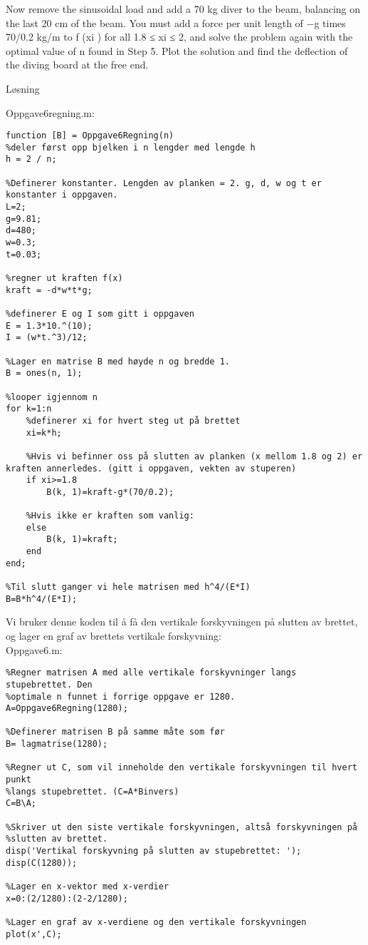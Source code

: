 
%
Now remove the sinusoidal load and add a 70 kg diver to the beam, balancing on the last 20 cm of the beam. You must add a force per unit length of −g times 70/0.2 kg/m to f (xi ) for all 1.8 ≤ xi ≤ 2, and solve the problem again with the optimal value of n found in Step 5. Plot the solution and find the deflection of the diving board at the free end.

\vspace{5mm}
Løsning

Oppgave6regning.m:
\begin{lstlisting}
function [B] = Oppgave6Regning(n)
%deler først opp bjelken i n lengder med lengde h 
h = 2 / n;        

%Definerer konstanter. Lengden av planken = 2. g, d, w og t er konstanter i oppgaven. 
L=2;
g=9.81; 
d=480; 
w=0.3;
t=0.03; 

%regner ut kraften f(x) 
kraft = -d*w*t*g; 

%definerer E og I som gitt i oppgaven
E = 1.3*10.^(10); 
I = (w*t.^3)/12; 

%Lager en matrise B med høyde n og bredde 1. 
B = ones(n, 1);

%looper igjennom n
for k=1:n
	%definerer xi for hvert steg ut på brettet
    xi=k*h; 

    %Hvis vi befinner oss på slutten av planken (x mellom 1.8 og 2) er kraften annerledes. (gitt i oppgaven, vekten av stuperen)
    if xi>=1.8
        B(k, 1)=kraft-g*(70/0.2);

    %Hvis ikke er kraften som vanlig:
    else
        B(k, 1)=kraft;
    end
end;

%Til slutt ganger vi hele matrisen med h^4/(E*I)
B=B*h^4/(E*I);
\end{lstlisting}

Vi bruker denne koden til å få den vertikale forskyvningen på slutten av brettet, og lager en graf av brettets vertikale forskyvning:\\

Oppgave6.m: 

\begin{lstlisting}
%Regner matrisen A med alle vertikale forskyvninger langs stupebrettet. Den
%optimale n funnet i forrige oppgave er 1280.
A=Oppgave6Regning(1280); 

%Definerer matrisen B på samme måte som før
B= lagmatrise(1280); 

%Regner ut C, som vil inneholde den vertikale forskyvningen til hvert punkt
%langs stupebrettet. (C=A*Binvers)
C=B\A; 

%Skriver ut den siste vertikale forskyvningen, altså forskyvningen på
%slutten av brettet. 
disp('Vertikal forskyvning på slutten av stupebrettet: '); 
disp(C(1280)); 

%Lager en x-vektor med x-verdier
x=0:(2/1280):(2-2/1280); 

%Lager en graf av x-verdiene og den vertikale forskyvningen
plot(x',C);
\end{lstlisting} 

